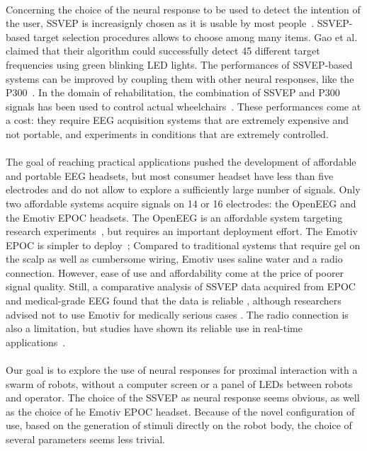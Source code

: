 \documentclass[smallextended]{svjour3}
\begin{document}
\\
Concerning the choice of the neural response to be used to detect the intention of the user, SSVEP is increasignly chosen as it is usable by most people~\cite{Guger2012}. SSVEP-based target selection procedures allows to choose among many items. Gao et al.~\cite{SSVEPfiability} claimed that their algorithm could successfully detect 45 different target frequencies using green blinking LED lights. The performances of SSVEP-based systems can be improved by coupling them with other neural responses, like the P300~\cite{yin2015hybrid}. In the domain of rehabilitation, the combination of SSVEP and P300 signals has been used to control actual wheelchairs~\cite{paper4}. These performances come at a cost: they require EEG acquisition systems that are extremely expensive and not portable, and experiments in conditions that are extremely controlled.\\
\\
The goal of reaching practical applications pushed the development of affordable and portable EEG headsets, but most consumer headset have less than five electrodes and do not allow to explore a sufficiently large number of signals. Only two affordable systems acquire signals on 14 or 16 electrodes: the OpenEEG and the Emotiv EPOC headsets. The OpenEEG is an affordable system targeting research experiments~\cite{Salehuddin2011}, but requires an important deployment effort. The Emotiv EPOC is simpler to deploy~\cite{jian2014improving,van2012designing}; Compared to traditional systems that require gel on the scalp as well as cumbersome wiring, Emotiv uses saline water and a radio connection. However, ease of use and affordability come at the price of poorer signal quality. Still, a comparative analysis of SSVEP data acquired from EPOC and medical-grade EEG found that the data is reliable \cite{liu2012implementation}, although researchers advised not to use Emotiv for medically serious cases \cite{duvinage2013performance}. The radio connection is also a limitation, but studies have shown its reliable use in real-time applications~\cite{hvaring2014comparison}.\\
\\
Our goal is to explore the use of neural responses for proximal interaction with a swarm of robots, without a computer screen or a panel of LEDs between robots and operator. The choice of the SSVEP as neural response seems obvious, as well as the choice of he Emotiv EPOC headset. Because of the novel configuration of use, based on the generation of stimuli directly on the robot body, the choice of several parameters seems less trivial. \\
\end{document}
